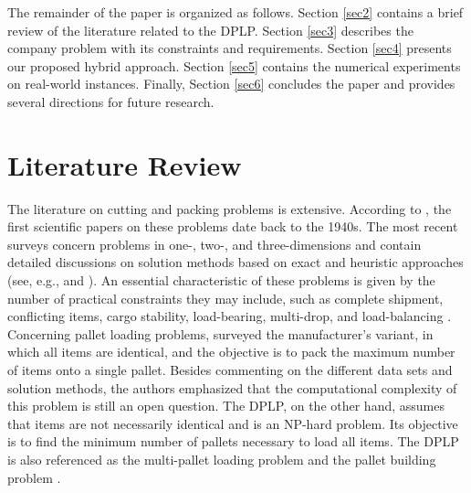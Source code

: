 \documentclass[runningheads]{llncs}
\newcommand{\rev}[1]{{#1}}
\begin{document}
The remainder of the paper is organized as follows. Section \ref{sec2} contains a brief review of the literature related to the DPLP. Section \ref{sec3} describes the company problem with its constraints and requirements. Section \ref{sec4} presents our proposed hybrid approach. Section \ref{sec5} contains the numerical experiments on real-world instances. Finally, Section \ref{sec6} concludes the paper and provides several directions for future research. 


\section{Literature Review \label{sec2}}

The literature on cutting and packing problems is extensive. According to \cite{Sweeney1992}, the first scientific papers on these problems date back to the 1940s. The most recent surveys concern problems in one-, two-, and three-dimensions and contain detailed discussions on solution methods based on exact and heuristic approaches (see, e.g., \cite{IORI2021} and \cite{Yagiura2025}). An essential characteristic of these problems is given by the number of practical constraints they may include, such as complete shipment, conflicting items, cargo stability, load-bearing, multi-drop, and load-balancing \cite{NASCIMENTO2021}. 
Concerning pallet loading problems, \cite{Silva2016} surveyed the manufacturer's variant, in which all items are identical, and the objective is to pack the maximum number of items onto a single pallet. Besides commenting on the different data sets and solution methods, the authors emphasized that the computational complexity of this problem is still an open question. 
\rev{The DPLP, on the other hand, assumes that items are not necessarily identical and is an NP-hard problem. Its objective is to find the minimum number of pallets necessary to load all items. The DPLP is also referenced as the multi-pallet loading problem \cite{TERNO2000} and the pallet building problem \cite{Calzavara2021}.}
\end{document}
